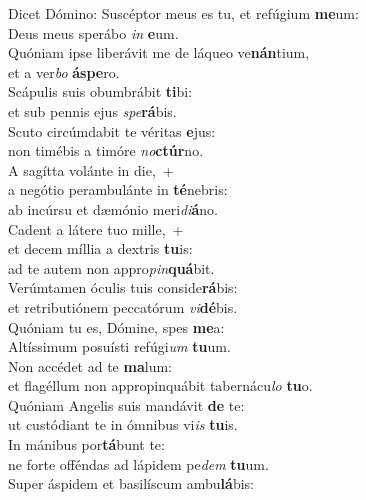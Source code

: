 \evenverse Dicet Dómino: Suscéptor meus es tu, et refúgium \textbf{me}um:~\*\\
\evenverse Deus meus sperábo \textit{in} \textbf{e}um.\\
\oddverse Quóniam ipse liberávit me de láqueo ve\textbf{nán}tium,~\*\\
\oddverse et a ver\textit{bo} \textbf{á}\textbf{spe}ro.\\
\evenverse Scápulis suis obumbrábit \textbf{ti}bi:~\*\\
\evenverse et sub pennis ejus \textit{spe}\textbf{rá}bis.\\
\oddverse Scuto circúmdabit te véritas \textbf{e}jus:~\*\\
\oddverse non timébis a timóre \textit{no}\textbf{ctúr}no.\\
\evenverse A sagítta volánte in die,~+\\
\evenverse  a negótio perambulánte in \textbf{té}nebris:~\*\\
\evenverse ab incúrsu et dæmónio meri\textit{di}\textbf{á}no.\\
\oddverse Cadent a látere tuo mille,~+\\
\oddverse  et decem míllia a dextris \textbf{tu}is:~\*\\
\oddverse ad te autem non appro\textit{pin}\textbf{quá}bit.\\
\evenverse Verúmtamen óculis tuis conside\textbf{rá}bis:~\*\\
\evenverse et retributiónem peccatórum \textit{vi}\textbf{dé}bis.\\
\oddverse Quóniam tu es, Dómine, spes \textbf{me}a:~\*\\
\oddverse Altíssimum posuísti refúgi\textit{um} \textbf{tu}um.\\
\evenverse Non accédet ad te \textbf{ma}lum:~\*\\
\evenverse et flagéllum non appropinquábit tabernácu\textit{lo} \textbf{tu}o.\\
\oddverse Quóniam Angelis suis mandávit \textbf{de} te:~\*\\
\oddverse ut custódiant te in ómnibus vi\textit{is} \textbf{tu}is.\\
\evenverse In mánibus por\textbf{tá}bunt te:~\*\\
\evenverse ne forte offéndas ad lápidem pe\textit{dem} \textbf{tu}um.\\
\oddverse Super áspidem et basilíscum ambu\textbf{lá}bis:~\*\\

